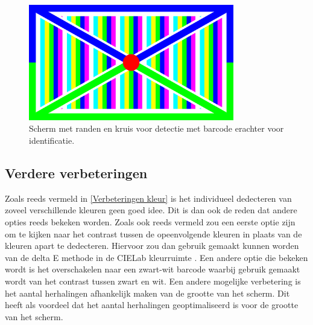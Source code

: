\begin{figure}[h!]
	\center
	\includegraphics[width=0.8\textwidth]{img/screen.png}
	\caption{Scherm met randen en kruis voor detectie met barcode erachter voor identificatie.}
	\label{html}
	\label{scherm}
\end{figure}

\subsection{Verdere verbeteringen}
Zoals reeds vermeld in \ref{Verbeteringen kleur} is het individueel dedecteren van zoveel verschillende kleuren geen goed idee. Dit is dan ook de reden dat andere opties reeds bekeken worden. Zoals ook reeds vermeld zou een eerste optie zijn om te kijken naar het contrast tussen de opeenvolgende kleuren in plaats van de kleuren apart te dedecteren. Hiervoor zou dan gebruik gemaakt kunnen worden van de delta E methode in de CIELab kleurruimte \cite{article}. Een andere optie die bekeken wordt is het overschakelen naar een zwart-wit barcode waarbij gebruik gemaakt wordt van het contrast tussen zwart en wit. Een andere mogelijke verbetering is het aantal herhalingen afhankelijk maken van de grootte van het scherm. Dit heeft als voordeel dat het aantal herhalingen geoptimaliseerd is voor de grootte van het scherm.
